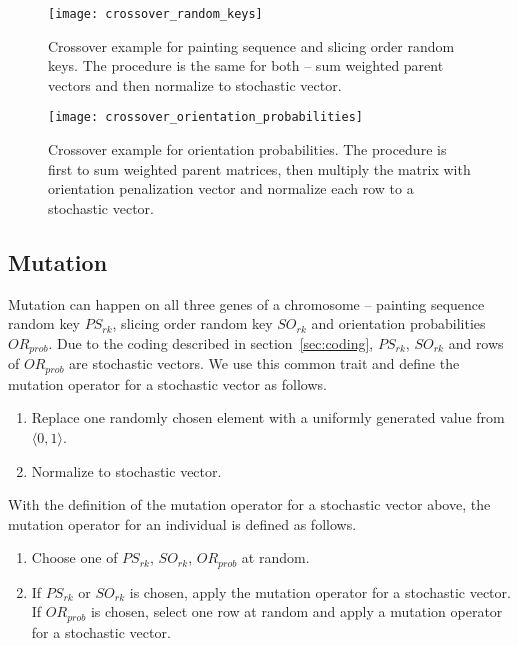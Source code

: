 \begin{figure}[!htp]
    \texttt{[image: crossover\_random\_keys]}
    \caption[Crossover example for painting sequence and slicing order random keys]{
        Crossover example for painting sequence and slicing order random keys.
        The procedure is the same for both – sum weighted parent vectors and then normalize to stochastic vector.
    }
    \label{fig:crossover-random-keys}
\end{figure}

\begin{figure}[!htp]
    \texttt{[image: crossover\_orientation\_probabilities]}
    \caption[Crossover example for orientation probabilities]{
        Crossover example for orientation probabilities. The procedure is first to sum weighted parent matrices,
        then multiply the matrix with orientation penalization vector and normalize each row to a stochastic vector.}
    \label{fig:crossover-orientation-probabilities}
\end{figure}

\subsection{Mutation}\label{subsec:mutation}

Mutation can happen on all three genes of a chromosome – painting sequence random key $PS_{rk}$,
slicing order random key $SO_{rk}$ and orientation probabilities $OR_{prob}$.
Due to the coding described in section~\ref{sec:coding}, $PS_{rk}$, $SO_{rk}$ and rows of $OR_{prob}$ are stochastic vectors.
We use this common trait and define the mutation operator for a stochastic vector as follows.

\begin{enumerate}
    \item Replace one randomly chosen element with a uniformly generated value from $\langle 0,1 \rangle$.
    \item Normalize to stochastic vector.
\end{enumerate}

With the definition of the mutation operator for a stochastic vector above, the mutation operator for an individual is defined as follows.

\begin{enumerate}
    \item Choose one of $PS_{rk}$, $SO_{rk}$, $OR_{prob}$ at random.
    \item If $PS_{rk}$ or $SO_{rk}$ is chosen, apply the mutation operator for a stochastic vector.\\
    If $OR_{prob}$ is chosen, select one row at random and apply a mutation operator for a stochastic vector.
\end{enumerate}

